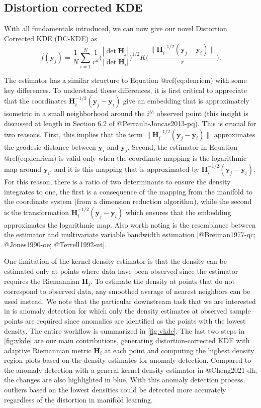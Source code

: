 \documentclass[
]{article}
\begin{document}
\hypertarget{DCKDE}{%
\subsection{Distortion corrected KDE}\label{DCKDE}}

With all fundamentals introduced, we can now give our novel Distortion
Corrected KDE (DC-KDE) as \begin{equation}
\label{eq:denestimator}
\hat{f}(\bm{y}_j) = \frac{1}{N} \sum_{i=1}^{N} \frac{1}{r^d} \bigg(\frac{|\det \bm{H}_j|}{|\det \bm{H}_i|} \bigg)^{1/2} K\bigg( \frac{\| \bm{H}^{-1/2}_i (\bm{y}_j - \bm{y}_i)\|}{r} \bigg).
\end{equation}

The estimator has a similar structure to Equation @ref(eq:denriem) with
some key differences. To understand these differences, it is first
critical to appreciate that the coordinates
\(\bm{H}^{-1/2}_i (\bm{y}_j - \bm{y}_i)\) give an embedding that is
approximately isometric in a small neighborhood around the \(i^{th}\)
observed point (this insight is discussed at length in Section 6.2 of
@Perrault-Joncas2013-pq). This is crucial for two reasons. First, this
implies that the term \(\| \bm{H}^{-1/2}_i (\bm{y}_j - \bm{y}_i)\|\)
approximates the geodesic distance between \(\bm{y}_i\) and
\(\bm{y}_j\). Second, the estimator in Equation @ref(eq:denriem) is
valid only when the coordinate mapping is the logarithmic map around
\(\bm{y}_i\), and it is this mapping that is approximated by
\(\bm{H}^{-1/2}_i (\bm{y}_j - \bm{y}_i)\). For this reason, there is a
ratio of two determinants to ensure the density integrates to one, the
first is a consequence of the mapping from the manifold to the
coordinate system (from a dimension reduction algorithm), while the
second is the transformation \(\bm{H}^{-1/2}_i (\bm{y}_j - \bm{y}_i)\)
which ensures that the embedding approximates the logarithmic map. Also
worth noting is the resemblance between the estimator and multivariate
variable bandwidth estimation {[}@Breiman1977-qc; @Jones1990-oe;
@Terrell1992-ut{]}.

One limitation of the kernel density estimator is that the density can
be estimated only at points where data have been observed since the
estimator requires the Riemannian \(\bm{H}_j\). To estimate the density
at points that do not correspond to observed data, any smoothed average
of nearest neighbors can be used instead. We note that the particular
downstream task that we are interested in is anomaly detection for which
only the density estimates at observed sample points are required since
anomalies are identified as the points with the lowest density. The
entire workflow is summarized in \autoref{fig:vkde}. The last two steps
in \autoref{fig:vkde} are our main contributions, generating
distortion-corrected KDE with adaptive Riemannian metric \(\bm{H}_i\) at
each point and computing the highest density region plots based on the
density estimates for anomaly detection. Compared to the anomaly
detection with a general kernel density estimator in @Cheng2021-dh, the
changes are also highlighted in blue. With this anomaly detection
process, outliers based on the lowest densities could be detected more
accurately regardless of the distortion in manifold learning.
\end{document}
